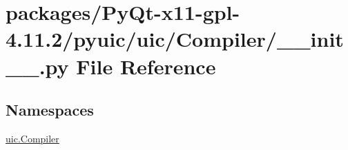 \hypertarget{packages_2PyQt-x11-gpl-4_811_82_2pyuic_2uic_2Compiler_2____init_____8py}{}\section{packages/\+Py\+Qt-\/x11-\/gpl-\/4.11.2/pyuic/uic/\+Compiler/\+\_\+\+\_\+init\+\_\+\+\_\+.py File Reference}
\label{packages_2PyQt-x11-gpl-4_811_82_2pyuic_2uic_2Compiler_2____init_____8py}
\subsection*{Namespaces}
\begin{DoxyCompactItemize}
\item 
 \hyperlink{namespaceuic_1_1Compiler}{uic.\+Compiler}
\end{DoxyCompactItemize}
